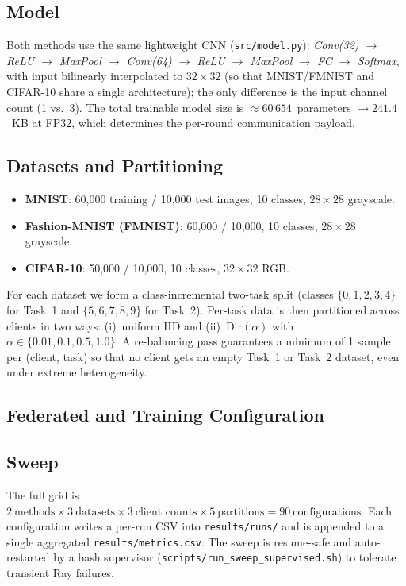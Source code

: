 \documentclass[journal]{IEEEtran}
\begin{document}
\subsection{Model}

Both methods use the same lightweight CNN
(\texttt{src/model.py}):
\textit{Conv(32) $\to$ ReLU $\to$ MaxPool $\to$ Conv(64) $\to$ ReLU
$\to$ MaxPool $\to$ FC $\to$ Softmax}, with input bilinearly
interpolated to $32{\times}32$ (so that MNIST/FMNIST and CIFAR-10
share a single architecture); the only difference is the input channel
count (1 vs.\ 3). The total trainable model size is $\approx
60\,654$~parameters $\to 241.4$~KB at FP32, which determines the
per-round communication payload.

\subsection{Datasets and Partitioning}

\begin{itemize}
    \item \textbf{MNIST}: 60{,}000 training / 10{,}000 test images,
        10 classes, $28{\times}28$ grayscale.
    \item \textbf{Fashion-MNIST (FMNIST)}: 60{,}000 / 10{,}000,
        10 classes, $28{\times}28$ grayscale.
    \item \textbf{CIFAR-10}: 50{,}000 / 10{,}000, 10 classes,
        $32{\times}32$ RGB.
\end{itemize}

For each dataset we form a class-incremental two-task split
(classes $\{0,1,2,3,4\}$ for Task~1 and $\{5,6,7,8,9\}$ for Task~2).
Per-task data is then partitioned across clients in two ways:
(i)~uniform IID and (ii)~$\mathrm{Dir}(\alpha)$ with
$\alpha\in\{0.01,0.1,0.5,1.0\}$.
A re-balancing pass guarantees a minimum of 1 sample per (client,
task) so that no client gets an empty Task~1 or Task~2 dataset, even
under extreme heterogeneity.

\subsection{Federated and Training Configuration}



\subsection{Sweep}

The full grid is $2~\textrm{methods} \times 3~\textrm{datasets}
\times 3~\textrm{client counts} \times 5~\textrm{partitions} =
90~\textrm{configurations}$. Each configuration writes a per-run CSV
into \texttt{results/runs/} and is appended to a single aggregated
\texttt{results/metrics.csv}. The sweep is resume-safe and
auto-restarted by a bash supervisor (\texttt{scripts/run\_sweep\_supervised.sh})
to tolerate transient Ray failures.
\end{document}
